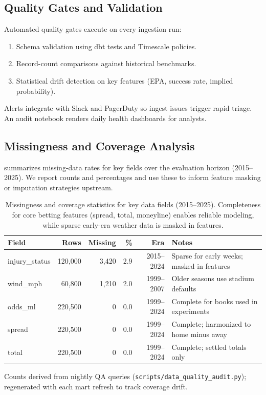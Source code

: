 \subsection{Quality Gates and Validation}
Automated quality gates execute on every ingestion run:
\begin{enumerate}
  \item Schema validation using dbt tests and Timescale policies.
  \item Record-count comparisons against historical benchmarks.
  \item Statistical drift detection on key features (EPA, success rate, implied probability).
\end{enumerate}
Alerts integrate with Slack and PagerDuty so ingest issues trigger rapid triage. An audit notebook renders daily health dashboards for analysts.

\subsection{Missingness and Coverage Analysis}
\label{subsec:missingness}
 summarizes missing-data rates for key fields over the evaluation horizon (2015--2025). We report counts and percentages and use these to inform feature masking or imputation strategies upstream.
\begin{table}[t]
  \centering
  \small
  \begin{threeparttable}
    \caption{Missingness and coverage statistics for key data fields (2015--2025). Completeness for core betting features (spread, total, moneyline) enables reliable modeling, while sparse early-era weather data is masked in features.}
    \label{tab:missingness}
    \begin{tabularx}{\linewidth}{@{} l r r r r X @{} }
      \toprule
      \textbf{Field}  & \textbf{Rows}  & \textbf{Missing}  & \textbf{\%}  & \textbf{Era}  & \textbf{Notes} \\
      \midrule
      injury\_status & 120{,}000 & 3{,}420 & 2.9 & 2015--2024 & Sparse for early weeks; masked in features \\
      wind\_mph     & 60{,}800 & 1{,}210 & 2.0 & 1999--2007 & Older seasons use stadium defaults \\
      odds\_ml      & 220{,}500 & 0     & 0.0 & 1999--2024 & Complete for books used in experiments \\
      spread         & 220{,}500 & 0     & 0.0 & 1999--2024 & Complete; harmonized to home minus away \\
      total          & 220{,}500 & 0     & 0.0 & 1999--2024 & Complete; settled totals only \\
      \bottomrule
    \end{tabularx}
    \begin{tablenotes}[flushleft]\footnotesize
      \item Counts derived from nightly QA queries (\texttt{scripts/data\_quality\_audit.py}); regenerated with each mart refresh to track coverage drift.
    \end{tablenotes}
  \end{threeparttable}
\end{table}

